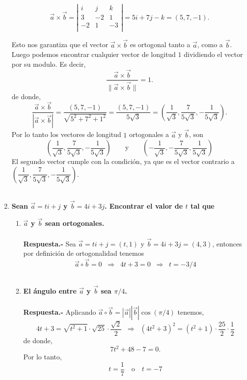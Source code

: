 \begin{enumerate}
    $$\vec{a}\times \vec{b} = \left|\begin{array}{rrr}
	i&j&k\\
	3&-2&1\\
	-2&1&-3\\
    \end{array}\right|=5i+7j-k=(5,7,-1).$$

    Esto nos garantiza que el vector $\vec{a}\times \vec{b}$ es ortogonal tanto a $\vec{a}$, como a $\vec{b}$. Luego podemos encontrar cualquier vector de longitud $1$ dividiendo el vector por su modulo. Es decir, 
    $$\dfrac{\vec{a}\times \vec{b}}{\|\vec{a}\times \vec{b}\|}=1.$$ 
    de donde, $$\dfrac{\vec{a}\times \vec{b}}{|\vec{a}\times \vec{b}|}=\dfrac{(5,7,-1)}{\sqrt{5^2+7^2+1^2}} = \dfrac{(5,7,-1)}{5\sqrt{3}} = \left(\dfrac{1}{\sqrt{3}},\dfrac{7}{5\sqrt{3}},-\dfrac{1}{5\sqrt{3}}\right).$$
    Por lo tanto los vectores de longitud $1$ ortogonales a $\vec{a}$ y $\vec{b}$, son $$\left(\dfrac{1}{\sqrt{3}},\dfrac{7}{5\sqrt{3}},-\dfrac{1}{5\sqrt{3}}\right) \qquad \mbox{y}\qquad \left(-\dfrac{1}{\sqrt{3}},-\dfrac{7}{5\sqrt{3}},\dfrac{1}{5\sqrt{3}}\right)$$
    El segundo vector cumple con la condición, ya que es el vector contrario a $\left(\dfrac{1}{\sqrt{3}},\dfrac{7}{5\sqrt{3}},-\dfrac{1}{5\sqrt{3}}\right)$.\\\\

\item \textbf{\boldmath Sean $\vec{a}=ti + j$ y $\vec{b}=4i+3j$. Encontrar el valor de $t$ tal que }

\begin{enumerate}[\bfseries a)]
    
    \item \textbf{\boldmath $\vec{a}$ y $\vec{b}$ sean ortogonales.\\\\
	Respuesta.-}\; Sea $\vec{a}=ti + j=(t,1)$ y $\vec{b}=4i+3j=(4,3)$, entonces por definición de ortogonalidad tenemos 
	$$\vec{a}\circ \vec{b} = 0 \;\; \Rightarrow \; \; 4t+3=0 \;\; \Rightarrow \; \; t=-3/4$$\\

    \item \textbf{\boldmath El ángulo entre $\vec{a}$ y $\vec{b}$ sea $\pi/4$.\\\\
	Respuesta.-}\; Aplicando $\vec{a}\circ \vec{b}=|\vec{a}||\vec{b}|\cos(\pi/4)$ tenemos, 
	$$4t+3=\sqrt{t^2+1}\cdot \sqrt{25}\cdot \dfrac{\sqrt{2}}{2} \;\; \Rightarrow \; \; (4t^2+3)^2=(t^2+1)\cdot\dfrac{25}{2}\cdot \dfrac{1}{2}$$
	de donde,  $$7t^2+48-7=0.$$
	Por lo tanto, $$t=\dfrac{1}{7} \quad \mbox{o}\quad t=-7$$\\


\end{enumerate}
\end{enumerate}
